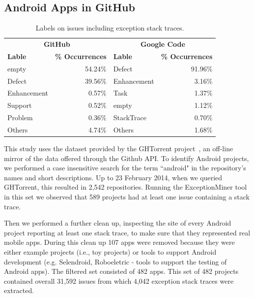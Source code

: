 

\subsection{Android Apps in GitHub}
\label{sec:git}


\begin{table}
  \scriptsize
  \centering
  \begin{tabular}{lr|lr}
    \hline
     \multicolumn{2}{c}{\bfseries{GitHub}} &  \multicolumn{2}{c}{\bfseries{Google Code}} \\
      \bfseries{Lable} &  \bfseries{\% Occurrences} &  \bfseries{Lable} &  \bfseries{\% Occurrences} \\
    \hline
empty &	54.24\% & Defect &	91.96\% \\
Defect &	39.56\%  & Enhancement  &	3.16\% \\
Enhancement &	0.57\% & Task	& 1.37\% \\
Support &	0.52\% & empty &	1.12\% \\
Problem &	0.36\% & StackTrace &	0.70\% \\
Others &	4.74\% &  Others &	1.68\% \\   
  \hline
  \end{tabular}
  \caption{Labels on issues including exception stack traces.}
  \label{tab:lables}
\end{table}


This study uses the dataset provided by the GHTorrent project~\cite{Gousi13}, 
an off-line mirror of the data  offered through the Github API.  
To identify Android projects, we performed a case insensitive search for the
term ``android" in the repository's names and short descriptions.  
Up to 23 February 2014,  when we queried GHTorrent, this resulted in 2,542 repositories. Running the ExceptionMiner tool 
 in this set we observed that 589 projects had at least one issue containing a stack trace.
	
Then we performed a further clean up, inspecting the site of every Android project
reporting at least one stack trace, to make sure that they represented real
mobile apps. During this clean up 107 apps were removed because they were either
example projects (i.e., toy projects) or tools to support Android development
(e.g. Selendroid, Roboeletric - tools to support the testing of Android apps).
The filtered set consisted of 482 apps. This set of 482 projects contained overall 31,592 issues from which 4,042 exception stack traces 
were extracted. 

